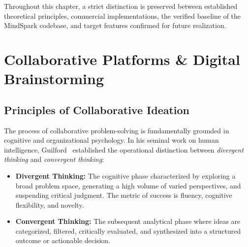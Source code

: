Throughout this chapter, a strict distinction is preserved between established theoretical principles, commercial implementations, the verified baseline of the MindSpark codebase, and target features confirmed for future realization.


\section{Collaborative Platforms \& Digital Brainstorming}
\label{sec:collab_platforms}

\subsection{Principles of Collaborative Ideation}
\label{subsec:ideation_principles}

The process of collaborative problem-solving is fundamentally grounded in cognitive and organizational psychology. In his seminal work on human intelligence, Guilford~\cite{guilford1956structure} established the operational distinction between \textit{divergent thinking} and \textit{convergent thinking}:
\begin{itemize}
    \item \textbf{Divergent Thinking:} The cognitive phase characterized by exploring a broad problem space, generating a high volume of varied perspectives, and suspending critical judgment. The metric of success is fluency, cognitive flexibility, and novelty.
    \item \textbf{Convergent Thinking:} The subsequent analytical phase where ideas are categorized, filtered, critically evaluated, and synthesized into a structured outcome or actionable decision.
\end{itemize}

